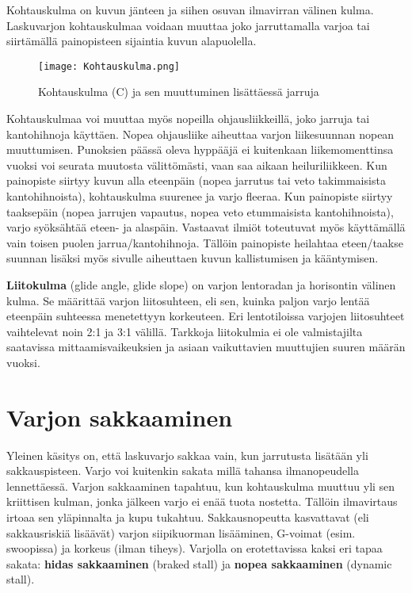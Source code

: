 Kohtauskulma on kuvun jänteen ja siihen osuvan ilmavirran välinen kulma. Laskuvarjon kohtauskulmaa voidaan muuttaa joko jarruttamalla varjoa tai siirtämällä painopisteen sijaintia kuvun alapuolella.  


\begin{figure*}[]\centering\texttt{[image: Kohtauskulma.png]}\caption{Kohtauskulma (C) ja sen muuttuminen lisättäessä jarruja}\end{figure*} 


Kohtauskulmaa voi muuttaa myös nopeilla ohjausliikkeillä, joko jarruja tai kantohihnoja käyttäen. Nopea ohjausliike aiheuttaa varjon liikesuunnan nopean muuttumisen. Punoksien päässä oleva hyppääjä ei kuitenkaan liikemomenttinsa vuoksi voi seurata muutosta välittömästi, vaan saa aikaan heiluriliikkeen. Kun painopiste siirtyy kuvun alla eteenpäin (nopea jarrutus tai veto takimmaisista kantohihnoista), kohtauskulma suurenee ja varjo fleeraa. Kun painopiste siirtyy taaksepäin (nopea jarrujen vapautus, nopea veto etummaisista kantohihnoista), varjo syöksähtää eteen- ja alaspäin. Vastaavat ilmiöt toteutuvat myös käyttämällä vain toisen puolen jarrua/kantohihnoja. Tällöin painopiste heilahtaa eteen/taakse suunnan lisäksi myös sivulle aiheuttaen kuvun kallistumisen ja kääntymisen.  


\textbf{Liitokulma} (glide angle, glide slope) on varjon lentoradan ja horisontin välinen kulma. Se määrittää varjon liitosuhteen, eli sen, kuinka paljon varjo lentää eteenpäin suhteessa menetettyyn korkeuteen. Eri lentotiloissa varjojen liitosuhteet vaihtelevat noin 2:1 ja 3:1 välillä. Tarkkoja liitokulmia ei ole valmistajilta saatavissa mittaamisvaikeuksien ja asiaan vaikuttavien muuttujien suuren määrän vuoksi. 

\section{ Varjon sakkaaminen }
\label{laskuvarjoon-vaikuttavat-fysikaaliset-voimat-ja-nosteen-syntyminen-varjon-sakkaaminen}


Yleinen käsitys on, että laskuvarjo sakkaa vain, kun jarrutusta lisätään yli sakkauspisteen. Varjo voi kuitenkin sakata millä tahansa ilmanopeudella lennettäessä. Varjon sakkaaminen tapahtuu, kun kohtauskulma muuttuu yli sen kriittisen kulman, jonka jälkeen varjo ei enää tuota nostetta. Tällöin ilmavirtaus irtoaa sen yläpinnalta ja kupu tukahtuu. Sakkausnopeutta kasvattavat (eli sakkausriskiä lisäävät) varjon siipikuorman lisääminen, G-voimat (esim. swoopissa) ja korkeus (ilman tiheys). Varjolla on erotettavissa kaksi eri tapaa sakata: \textbf{hidas sakkaaminen} (braked stall) ja \textbf{nopea sakkaaminen} (dynamic stall). 


